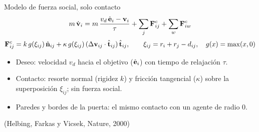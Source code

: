 \begin{frame}{Modelo de fuerza social, solo contacto}
  \small
  \[
    m\,\dot{\mathbf{v}}_i = m\,\frac{v_d\,\hat{\mathbf{e}}_i-\mathbf{v}_i}{\tau}
      + \sum_{j}\mathbf{F}^c_{ij} + \sum_{w}\mathbf{F}^c_{iw}
  \]
  \[
    \mathbf{F}^c_{ij} = k\,g(\xi_{ij})\,\hat{\mathbf{n}}_{ij}
      + \kappa\,g(\xi_{ij})\,(\Delta\mathbf{v}_{ij}\cdot\hat{\mathbf{t}}_{ij})\,\hat{\mathbf{t}}_{ij},
    \qquad \xi_{ij}=r_i+r_j-d_{ij},\quad g(x)=\max(x,0)
  \]
  \begin{itemize}
    \item Deseo: velocidad $v_d$ hacia el objetivo ($\hat{\mathbf{e}}_i$) con tiempo de relajación $\tau$.
    \item Contacto: resorte normal (rigidez $k$) y fricción tangencial ($\kappa$) sobre la
      superposición $\xi_{ij}$; sin fuerza social.
    \item Paredes y bordes de la puerta: el mismo contacto con un agente de radio $0$.
  \end{itemize}
  \vfill
  {\scriptsize (Helbing, Farkas y Vicsek, Nature, 2000)}
\end{frame}
